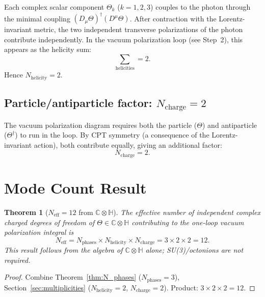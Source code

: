 \documentclass[12pt,a4paper]{article}
\newtheorem{theorem}{Theorem}[section]
\theoremstyle{definition}
\theoremstyle{remark}
\newcommand{\C}{\mathbb{C}}
\renewcommand{\H}{\mathbb{H}}
\newcommand{\Neff}{N_{\mathrm{eff}}}
\begin{document}
Each complex scalar component $\Theta_k$ ($k=1,2,3$) couples to the photon
through the minimal coupling $(D_\mu\Theta)^\dagger(D^\mu\Theta)$.  After
contraction with the Lorentz-invariant metric, the two independent
transverse polarizations of the photon contribute independently.  In the
vacuum polarization loop (see Step~2), this appears as the helicity sum:
\begin{equation}
  \sum_{\text{helicities}} = 2.
  \label{eq:helicity_sum}
\end{equation}
Hence $N_\mathrm{helicity} = 2$.

\subsection{Particle/antiparticle factor: $N_\mathrm{charge} = 2$}

The vacuum polarization diagram requires both the particle ($\Theta$) and
antiparticle ($\Theta^\dagger$) to run in the loop.  By CPT symmetry (a
consequence of the Lorentz-invariant action), both contribute equally, giving
an additional factor:
\begin{equation}
  N_\mathrm{charge} = 2.
  \label{eq:charge_factor}
\end{equation}

\section{Mode Count Result}
\label{sec:count}

\begin{theorem}[$\Neff = 12$ from $\C \otimes \H$]
\label{thm:Neff12}
The effective number of independent complex charged degrees of freedom
of $\Theta \in \C \otimes \H$ contributing to the one-loop vacuum polarization
integral is
\begin{equation}
  \boxed{\Neff = N_\mathrm{phases} \times N_\mathrm{helicity} \times N_\mathrm{charge}
  = 3 \times 2 \times 2 = 12.}
  \label{eq:Neff_12}
\end{equation}
This result follows from the algebra of $\C \otimes \H$ alone; SU(3)/octonions
are not required.
\end{theorem}

\begin{proof}
  Combine Theorem~\ref{thm:N_phases} ($N_\mathrm{phases} = 3$),
  Section~\ref{sec:multiplicities} ($N_\mathrm{helicity} = 2$,
  $N_\mathrm{charge} = 2$).
  Product: $3 \times 2 \times 2 = 12$.
\end{proof}
\end{document}
